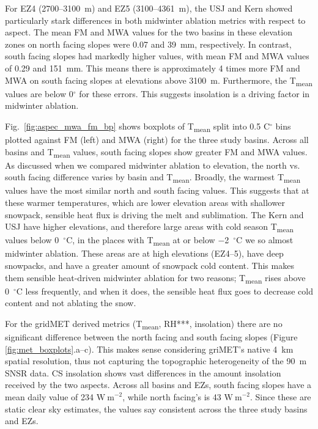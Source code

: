 For EZ4 (2700--3100~m) and EZ5 (3100--4361~m), the USJ and Kern showed particularly stark differences in both midwinter ablation metrics with respect to aspect. The mean FM and MWA values for the two basins in these elevation zones on north facing slopes were 0.07 and 39~mm, respectively. In contrast, south facing slopes had markedly higher values, with mean FM and MWA values of 0.29 and 151~mm. This means there is approximately 4 times more FM and MWA on south facing slopes at elevations above 3100~m. Furthermore, the T\textsubscript{mean} values are below 0$^{\circ}$ for these errors. This suggests insolation is a driving factor in midwinter ablation.

Fig.~\ref{fig:aspec_mwa_fm_bp} shows boxplots of T\textsubscript{mean} split into 0.5 C$^{\circ}$ bins plotted against FM (left) and MWA (right) for the three study basins. Across all basins and T\textsubscript{mean} values, south facing slopes show greater FM and MWA values. As discussed when we compared midwinter ablation to elevation, the north vs. south facing difference varies by basin and T\textsubscript{mean}. Broadly, the warmest T\textsubscript{mean} values have the most similar north and south facing values. This suggests that at these warmer temperatures, which are lower elevation areas with shallower snowpack, sensible heat flux is driving the melt and sublimation. 
The Kern and USJ have higher elevations, and therefore large areas with cold season T\textsubscript{mean} values below 0~$^{\circ}$C, in the places with T\textsubscript{mean} at or below $-$2~$^{\circ}$C we so almost midwinter ablation. These areas are at high elevations (EZ4--5), have deep snowpacks, and have a greater amount of snowpack cold content. This makes them sensible heat-driven midwinter ablation for two reasons; T\textsubscript{mean} rises above 0~$^{\circ}$C less frequently, and when it does, the sensible heat flux goes to decrease cold content and not ablating the snow.

For the gridMET derived metrics (T\textsubscript{mean}, RH***, insolation) there are no significant difference between the north facing and south facing slopes (Figure \ref{fig:met_boxplots}.a--c). This makes sense considering griMET's native 4~km spatial resolution, thus not capturing the topographic heterogeneity of the 90~m SNSR data. CS insolation shows vast differences in the amount insolation received by the two aspects. Across all basins and EZs, south facing slopes have a mean daily value of 234 $\mathrm{W~m}^{-2}$, while north facing's is 43 $\mathrm{W~m}^{-2}$. Since these are static clear sky estimates, the values say consistent across the three study basins and EZs.


